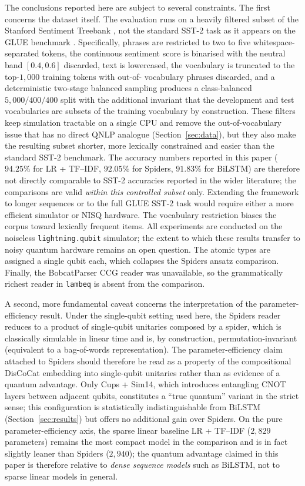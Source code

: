 \documentclass[11pt, a4paper]{article}
\begin{document}
The conclusions reported here are subject to several constraints.
The first concerns the dataset itself. The evaluation runs on a
heavily filtered subset of the Stanford Sentiment Treebank
\citep{socher2013}, not the standard SST-2 task as it appears on the
GLUE benchmark \citep{wang2018glue}. Specifically, phrases are
restricted to two to five whitespace-separated tokens, the
continuous sentiment score is binarised with the neutral band
\([0.4, 0.6]\) discarded, text is lowercased, the vocabulary is
truncated to the top-\(1{,}000\) training tokens with out-of-
vocabulary phrases discarded, and a deterministic two-stage
balanced sampling produces a class-balanced \(5{,}000/400/400\)
split with the additional invariant that the development and test
vocabularies are subsets of the training vocabulary by construction.
These filters keep simulation tractable on a single CPU and remove
the out-of-vocabulary issue that has no direct QNLP analogue
(Section~\ref{sec:data}), but they also make the resulting subset
shorter, more lexically constrained and easier than the standard
SST-2 benchmark. The accuracy numbers reported in this paper
(\(94.25\%\) for LR + TF--IDF, \(92.05\%\) for Spiders,
\(91.83\%\) for BiLSTM) are therefore not directly comparable to
SST-2 accuracies reported in the wider literature; the comparisons
are valid \emph{within this controlled subset} only. Extending the
framework to longer sequences or to the full GLUE SST-2 task would
require either a more efficient simulator or NISQ hardware. The
vocabulary restriction biases the corpus toward lexically frequent
items. All experiments are conducted on the noiseless
\texttt{lightning.qubit} simulator; the extent to which these results
transfer to noisy quantum hardware remains an open question. The
atomic types are assigned a single qubit each, which collapses the
Spiders ansatz comparison. Finally, the BobcatParser CCG reader was
unavailable, so the grammatically richest reader in \texttt{lambeq} is
absent from the comparison.

A second, more fundamental caveat concerns the interpretation of the
parameter-efficiency result. Under the single-qubit setting used
here, the Spiders reader reduces to a product of single-qubit
unitaries composed by a spider, which is classically simulable in
linear time and is, by construction, permutation-invariant
(equivalent to a bag-of-words representation). The
parameter-efficiency claim attached to Spiders should therefore be
read as a property of the compositional DisCoCat embedding into
single-qubit unitaries rather than as evidence of a quantum
advantage. Only Cups + Sim14, which introduces entangling CNOT
layers between adjacent qubits, constitutes a ``true quantum''
variant in the strict sense; this configuration is statistically
indistinguishable from BiLSTM (Section~\ref{sec:results}) but offers
no additional gain over Spiders. On the pure parameter-efficiency
axis, the sparse linear baseline LR + TF--IDF (\(2{,}829\)
parameters) remains the most compact model in the comparison and is
in fact slightly leaner than Spiders (\(2{,}940\)); the quantum
advantage claimed in this paper is therefore relative to
\emph{dense sequence models} such as BiLSTM, not to sparse
linear models in general.
\end{document}
